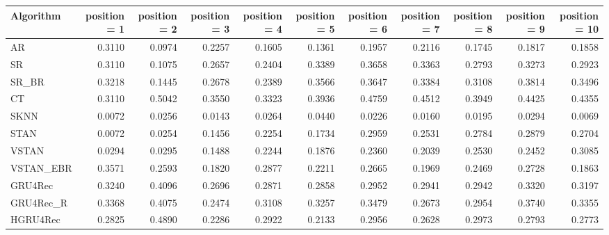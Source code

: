 \begin{tabular}{lrrrrrrrrrr}
\toprule
 Algorithm &  position = 1 &  position = 2 &  position = 3 &  position = 4 &  position = 5 &  position = 6 &  position = 7 &  position = 8 &  position = 9 &  position = 10 \\
\midrule
        AR &        0.3110 &        0.0974 &        0.2257 &        0.1605 &        0.1361 &        0.1957 &        0.2116 &        0.1745 &        0.1817 &         0.1858 \\
        SR &        0.3110 &        0.1075 &        0.2657 &        0.2404 &        0.3389 &        0.3658 &        0.3363 &        0.2793 &        0.3273 &         0.2923 \\
     SR\_BR &        0.3218 &        0.1445 &        0.2678 &        0.2389 &        0.3566 &        0.3647 &        0.3384 &        0.3108 &        0.3814 &         0.3496 \\
        CT &        0.3110 &        0.5042 &        0.3550 &        0.3323 &        0.3936 &        0.4759 &        0.4512 &        0.3949 &        0.4425 &         0.4355 \\
      SKNN &        0.0072 &        0.0256 &        0.0143 &        0.0264 &        0.0440 &        0.0226 &        0.0160 &        0.0195 &        0.0294 &         0.0069 \\
      STAN &        0.0072 &        0.0254 &        0.1456 &        0.2254 &        0.1734 &        0.2959 &        0.2531 &        0.2784 &        0.2879 &         0.2704 \\
     VSTAN &        0.0294 &        0.0295 &        0.1488 &        0.2244 &        0.1876 &        0.2360 &        0.2039 &        0.2530 &        0.2452 &         0.3085 \\
 VSTAN\_EBR &        0.3571 &        0.2593 &        0.1820 &        0.2877 &        0.2211 &        0.2665 &        0.1969 &        0.2469 &        0.2728 &         0.1863 \\
   GRU4Rec &        0.3240 &        0.4096 &        0.2696 &        0.2871 &        0.2858 &        0.2952 &        0.2941 &        0.2942 &        0.3320 &         0.3197 \\
 GRU4Rec\_R &        0.3368 &        0.4075 &        0.2474 &        0.3108 &        0.3257 &        0.3479 &        0.2673 &        0.2954 &        0.3740 &         0.3355 \\
  HGRU4Rec &        0.2825 &        0.4890 &        0.2286 &        0.2922 &        0.2133 &        0.2956 &        0.2628 &        0.2973 &        0.2793 &         0.2773 \\
\bottomrule
\end{tabular}
